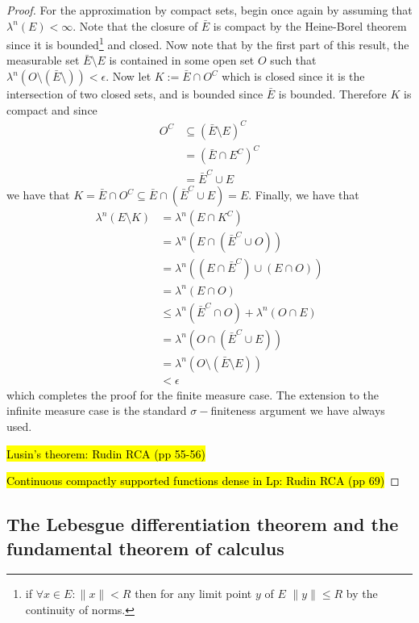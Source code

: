 \begin{proof}
For the approximation by compact sets, begin once again by assuming that $\lambda^n(E) < \infty$. Note that the closure of $\bar{E}$ is compact by the Heine-Borel theorem since it is bounded\footnote{if $\forall x \in E: \lVert x \rVert < R$ then for any limit point $y$ of $E$ $\lVert y \rVert \leq R$ by the continuity of norms.} and closed. Now note that by the first part of this result, the measurable set $\bar{E} \setminus E$ is contained in some open set $O$ such that $\lambda^n(O \setminus \left(\bar{E} \setminus  \right)) < \epsilon $. Now let $K := \bar{E} \cap O^C$ which is closed since it is the intersection of two closed sets, and is bounded since $\bar{E}$ is bounded. Therefore $K$ is compact and since
\begin{align*}
	O^C &\subseteq \left(\bar{E} \setminus E\right)^C \\
	&= \left(\bar{E} \cap E^C \right)^C \\
	&= \bar{E}^C \cup E
\end{align*}
we have that $K = \bar{E} \cap O^C \subseteq \bar{E} \cap \left(\bar{E}^C \cup E\right) = E$. Finally, we have that 
\begin{align*}
	\lambda^n\left(E \setminus K\right) &= \lambda^n\left(E \cap K^C\right) \\
	&= \lambda^n\left(E \cap \left(\bar{E}^C \cup O\right)\right) \\
	&= \lambda^n\left(\left(E \cap \bar{E}^C\right) \cup  \left( E \cap O \right)\right) \\
	&= \lambda^n \left(E \cap O\right) \\
	&\leq \lambda^n\left(\bar{E}^C \cap O\right) + \lambda^n\left(O \cap E\right) \\
	&=\lambda^n\left(O \cap \left(\bar{E}^C \cup E\right)\right) \\
	&=\lambda^n \left(O \setminus \left(\bar{E}\setminus E\right)\right) \\
	&< \epsilon
\end{align*}  
which completes the proof for the finite measure case. The extension to the infinite measure case is the standard $\sigma-$finiteness argument we have always used.

\hl{Lusin's theorem: Rudin RCA (pp 55-56)}

\hl{Continuous compactly supported functions dense in Lp: Rudin RCA (pp 69)}

\end{proof}



\subsection{The Lebesgue differentiation theorem and the fundamental theorem
of calculus}

